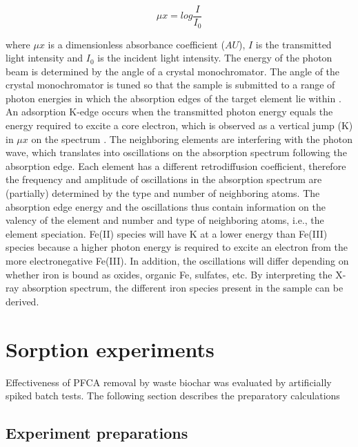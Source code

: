 \begin{equation}\label{eq:absorbance}
    \mu x = log \frac{I}{I_0}
\end{equation}

where $\mu x$ is a dimensionless absorbance coefficient ($AU$), $I$ is the transmitted light intensity and $I_0$ is the incident light intensity. The energy of the photon beam is determined by the angle of a crystal monochromator. The angle of the crystal monochromator is tuned so that the sample is submitted to a range of photon energies in which the absorption edges of the target element lie within \citep{vlaica2004exafs}. An adsorption K-edge occurs when the transmitted photon energy equals the energy required to excite a core electron, which is observed as a vertical jump (K) in $\mu x$ on the spectrum \citep{vlaica2004exafs}. The neighboring elements are interfering with the photon wave, which translates into oscillations on the absorption spectrum following the absorption edge. Each element has a different retrodiffusion coefficient, therefore the frequency and amplitude of oscillations in the absorption spectrum are (partially) determined by the type and number of neighboring atoms. The absorption edge energy and the oscillations thus contain information on the valency of the element and number and type of neighboring atoms, i.e., the element speciation. Fe(II) species will have K at a lower energy than Fe(III) species because a higher photon energy is required to excite an electron from the more electronegative Fe(III). In addition, the oscillations will differ depending on whether iron is bound as oxides, organic Fe, sulfates, etc. By interpreting the X-ray absorption spectrum, the different iron species present in the sample can be derived.


\section{Sorption experiments}
Effectiveness of PFCA removal by waste biochar was evaluated by artificially spiked batch tests. The following section describes the preparatory calculations
\subsection{Experiment preparations}

